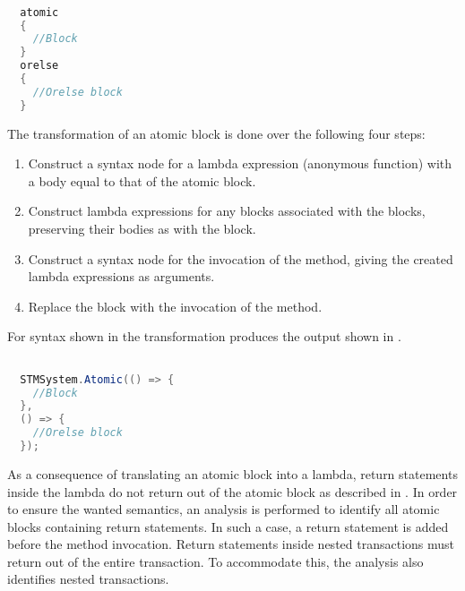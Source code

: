 \begin{lstlisting}[label=lst:before_atomic_block,
  caption={\bscode{atomic} Block Before Transformation},
  language=Java,  
  showspaces=false,
  showtabs=false,
  breaklines=true,
  showstringspaces=false,
  breakatwhitespace=true,
  commentstyle=\color{greencomments},
  keywordstyle=\color{bluekeywords},
  stringstyle=\color{redstrings},
  morekeywords={atomic, retry, orelse, var, get, set}]  % Start your code-block

  atomic
  {
    //Block
  }
  orelse
  {
    //Orelse block
  }
\end{lstlisting}
The transformation of an atomic block is done over the following four steps:
\begin{enumerate}
	\item Construct a syntax node for a lambda expression (anonymous function) with a body equal to that of the atomic block.
	\item Construct lambda expressions for any  blocks associated with the  blocks, preserving their bodies as with the  block.
	\item Construct a syntax node for the invocation of the  method, giving the created lambda expressions as arguments.
	\item Replace the  block with the invocation of the  method.
\end{enumerate}
For syntax shown in  the transformation produces the output shown in .

\begin{lstlisting}[label=lst:after_atomic_block,
  caption={\bscode{atomic} Block After Transformation},
  language=Java,  
  showspaces=false,
  showtabs=false,
  breaklines=true,
  showstringspaces=false,
  breakatwhitespace=true,
  commentstyle=\color{greencomments},
  keywordstyle=\color{bluekeywords},
  stringstyle=\color{redstrings},
  morekeywords={atomic, retry, orelse, var, get, set}]  % Start your code-block

  STMSystem.Atomic(() => {
    //Block					
  },
  () => {
    //Orelse block
  });
\end{lstlisting}
As a consequence of translating an atomic block into a lambda, return statements inside the lambda do not return out of the atomic block as described in . In order to ensure the wanted semantics, an analysis is performed to identify all atomic blocks containing return statements. In such a case, a return statement is added before the method invocation. Return statements inside nested transactions must return out of the entire transaction. To accommodate this, the analysis also identifies nested transactions.

